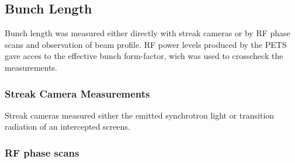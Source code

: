 \subsection{Bunch Length}

Bunch length was measured either directly with streak cameras or 
by RF phase scans and observation of beam profile.
RF power levels produced by the PETS gave acces to the effective bunch form-factor,
wich was used to crosscheck the measurements. 

\subsubsection{Streak Camera Measurements }

Streak cameras measured either the emitted synchrotron light or 
transition radiation of an intercepted screens. 

\subsubsection{\label{sec:rfphasescans}RF phase scans}


